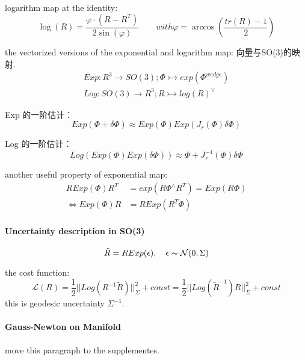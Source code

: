 \documentclass[10pt,a4paper]{article}
\begin{document}
logarithm map at the identity:
\begin{equation}
\log(R)=\frac{\varphi \cdot (R-R^T)}{2\sin(\varphi)} \qquad 
with \varphi=\arccos(\frac{tr(R)-1}{2})
\end{equation}

the vectorized versions of the exponential and logarithm map: 向量与SO(3)的映射. 
\begin{subequations}
\begin{align}
Exp:  R^3 \rightarrow SO(3); \Phi \rightarrowtail exp(\Phi^{wedge}) \\
Log:  SO(3) \rightarrow R^3; R \rightarrowtail log(R)^{\vee}
\end{align}
\end{subequations}

Exp 的一阶估计：
\begin{equation}
Exp(\Phi + \delta \Phi)\approx Exp(\Phi)Exp(J_{r}(\Phi)\delta \Phi)
\end{equation}

Log 的一阶估计：
\begin{equation}
Log(Exp(\Phi)Exp(\delta \Phi))\approx \Phi + J_{r}^{-1}(\Phi)\delta \Phi
\end{equation}

another useful property of exponential map:
\begin{subequations}
	\begin{align}
	R Exp(\Phi) R^T &= exp(R \Phi ^{\wedge} R^T)=Exp(R\Phi)\\
	\Leftrightarrow Exp(\Phi) R &= R Exp(R^T \Phi)
	\end{align}
\end{subequations}

\paragraph{Uncertainty description in SO(3)}
\begin{equation}
\tilde{R} = R Exp(\epsilon), \quad \epsilon \thicksim \mathcal{N}(0, \Sigma)
\end{equation}

the cost function:
\begin{equation}
\mathcal{L}(R)=\frac{1}{2}||Log(R^{-1}\tilde{R})||_{\Sigma}^{2} + const = 
\frac{1}{2}||Log(\tilde{R}^{-1}) R||_{\Sigma}^{2} + const
\end{equation}
this is geodesic uncertainty $\Sigma^{-1}$.
\paragraph{Gauss-Newton on Manifold}
move this paragraph to the supplementes.
\end{document}
